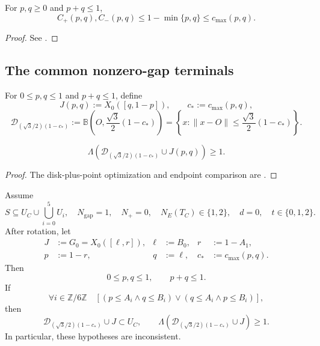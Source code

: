 \begin{lemma}
\label{lem:new-common-pair-domination}
For $p,q\ge0$ and $p+q\le1$,
\[
 C_+(p,q),C_-(p,q)\le1-\min\{p,q\}\le c_{\max}(p,q).
\]
\end{lemma}

\begin{proof}
See .
\end{proof}

\subsection{The common nonzero-gap terminals}

For $0\le p,q\le1$ and $p+q\le1$, define
\[
 J(p,q):=X_0([q,1-p]),
 \qquad c_*:=c_{\max}(p,q),
\]
\[
 \mathcal D_{(\sqrt3/2)(1-c_*)}:=
 \mathbb B\!\left(O,\frac{\sqrt3}{2}(1-c_*)\right)
 =\left\{x:\lVert x-O\rVert\le\frac{\sqrt3}{2}(1-c_*)\right\}.
\]

\begin{theorem}
\label{thm:new-complementary-gap}
\[
 \Lambda\!\left(\mathcal D_{(\sqrt3/2)(1-c_*)}\cup J(p,q)\right)\ge1.
\]
\end{theorem}

\begin{proof}
The disk-plus-point optimization and endpoint comparison are
.
\end{proof}



\begin{proposition}
\label{prop:finite-one-gap-common-terminal}
Assume
\[
 S\subseteq U_C\cup\bigcup_{i=0}^5U_i,
 \quad N_{\mathrm{gap}}=1,
 \quad N_+=0,
 \quad N_E(T_C)\in\{1,2\},
 \quad d=0,
 \quad t\in\{0,1,2\}.
\]
After rotation, let
\[
 \begin{aligned}
 J&:=G_0=X_0([\ell,r]),&
 \ell&:=B_0,&r&:=1-A_1,\\
 p&:=1-r,&q&:=\ell,&c_*&:=c_{\max}(p,q).
 \end{aligned}
\]
Then
\[
 0\le p,q\le1,
 \qquad p+q\le1.
\]
If
\[
 \forall i\in\mathbb Z/6\mathbb Z\quad
 [(p\le A_i\land q\le B_i)\lor(q\le A_i\land p\le B_i)],
\]
then
\[
 \mathcal D_{(\sqrt3/2)(1-c_*)}\cup J\subset U_C,
 \qquad
 \Lambda\!\left(\mathcal D_{(\sqrt3/2)(1-c_*)}\cup J\right)\ge1.
\]
In particular, these hypotheses are inconsistent.
\end{proposition}


